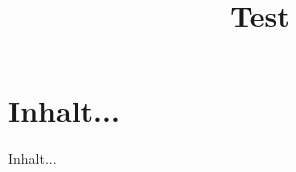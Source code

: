\documentclass[a4paper, 12pt, oneside]{scrbook}
\begin{document}
	
	\title{Test}
	\maketitle

	\chapter{Inhalt...}
		\thispagestyle{fancy}
	Inhalt...
\end{document}
